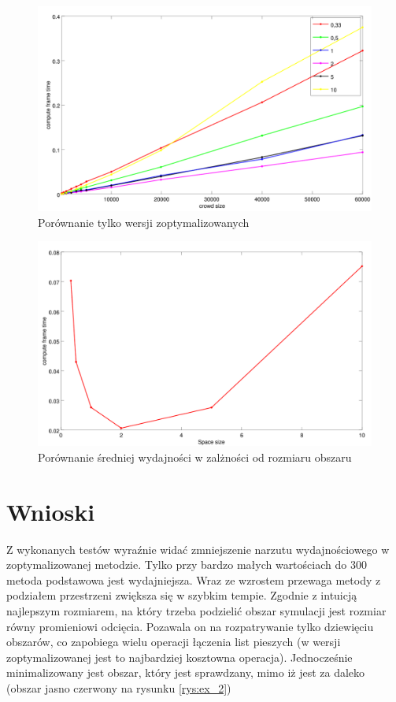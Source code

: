 \documentclass{article}
\begin{document}
\begin{figure}
    \centering
    \includegraphics[width=5.5in]{optimizeAll.png}
    \caption{Porównanie tylko wersji zoptymalizowanych}
    \label{rys:result3}
\end{figure}

\begin{figure}
    \centering
    \includegraphics[width=5.5in]{spaceSize.png}
    \caption{Porównanie średniej wydajności w zalżności od rozmiaru obszaru}
    \label{rys:result4}
\end{figure}

\section{Wnioski}

Z wykonanych testów wyraźnie widać zmniejszenie narzutu wydajnościowego w zoptymalizowanej metodzie. Tylko przy bardzo małych wartościach do 300 metoda podstawowa jest wydajniejsza. Wraz ze wzrostem przewaga metody z podziałem przestrzeni zwiększa się w szybkim tempie. Zgodnie z intuicją najlepszym rozmiarem, na który trzeba podzielić obszar symulacji jest rozmiar równy promieniowi odcięcia. Pozawala on na rozpatrywanie tylko dziewięciu obszarów, co zapobiega wielu operacji łączenia list pieszych (w wersji zoptymalizowanej jest to najbardziej kosztowna operacja). Jednocześnie minimalizowany jest obszar, który jest sprawdzany, mimo iż jest za daleko (obszar jasno czerwony na rysunku \ref{rys:ex_2})
\end{document}
